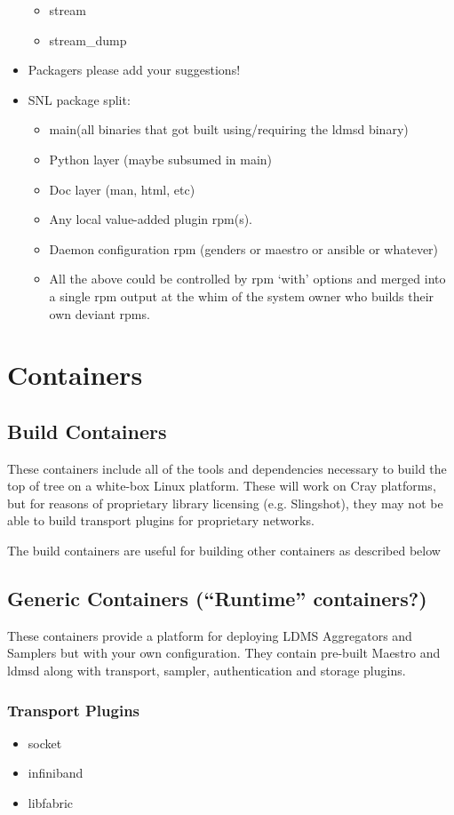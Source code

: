 \documentclass{article}
\begin{document}
\begin{itemize}
\begin{itemize}
            \item stream
            \item stream\_dump
        \end{itemize}
    \item Packagers please add your suggestions!
    \item SNL package split:
        \begin{itemize}
            \item main(all binaries that got built using/requiring the ldmsd binary)
            \item Python layer (maybe subsumed in main)
            \item Doc layer (man, html, etc)
            \item Any local value-added plugin rpm(s).
            \item Daemon configuration rpm (genders or maestro or ansible or whatever)
            \item All the above could be controlled by rpm ‘with’ options and merged into a single rpm output at the whim of the system owner who builds their own deviant rpms.
        \end{itemize}
\end{itemize}

\section{Containers}
\subsection{Build Containers}
These containers include all of the tools and dependencies necessary to build the top of tree on a white-box Linux platform. These will work on Cray platforms, but for reasons of proprietary library licensing (e.g. Slingshot), they may not be able to build transport plugins for proprietary networks.

The build containers are useful for building other containers as described below
\subsection{Generic Containers (“Runtime” containers?)}
These containers provide a platform for deploying LDMS Aggregators and Samplers but with your own configuration. They contain pre-built Maestro and ldmsd along with transport, sampler, authentication and storage plugins.

\subsubsection{Transport Plugins}
\begin{itemize}
    \item socket
\item infiniband
\item libfabric
\end{itemize}
\end{document}
